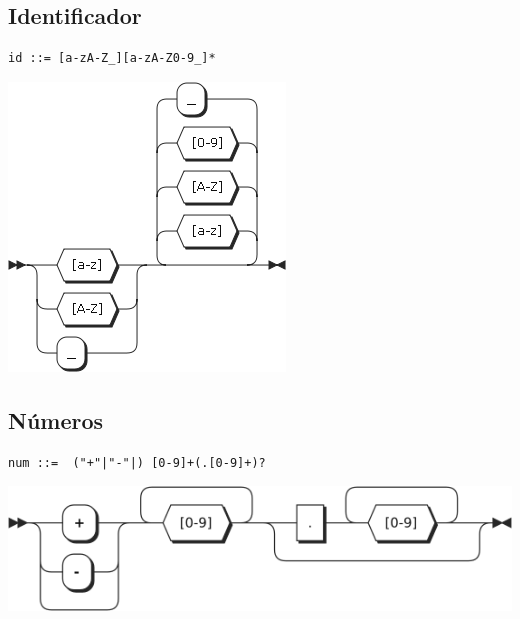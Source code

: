 \subsection{Identificador}
\begin{multicols}{2}
\begin{lstlisting}[style=nonumbers]      
id ::= [a-zA-Z_][a-zA-Z0-9_]*
\end{lstlisting}  
\columnbreak	
\begin{center}
\includegraphics[scale=0.4]{diagram/id.png} \\
\end{center}
\end{multicols}

\subsection{Números}
\begin{multicols}{2}
\begin{lstlisting}[style=nonumbers]      
num ::=  ("+"|"-"|) [0-9]+(.[0-9]+)?
\end{lstlisting}  
\columnbreak	
\begin{center}
\includegraphics[scale=0.5]{diagram/num.png} \\
\end{center}
\end{multicols}
